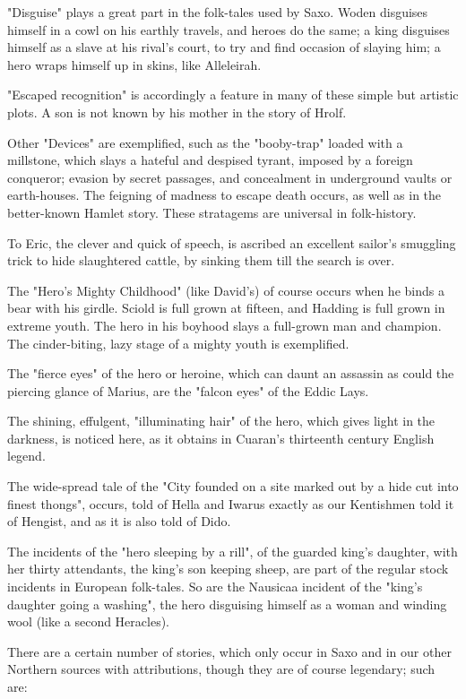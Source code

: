 \documentclass[10pt,a4paper]{report}
\begin{document}
"Disguise" plays a great part in the folk-tales used by Saxo. Woden disguises himself in a cowl on his earthly travels, and heroes do the same; a king disguises himself as a slave at his rival's court, to try and find occasion of slaying him; a hero wraps himself up in skins, like Alleleirah.

"Escaped recognition" is accordingly a feature in many of these simple but artistic plots. A son is not known by his mother in the story of Hrolf.

Other "Devices" are exemplified, such as the "booby-trap" loaded with a millstone, which slays a hateful and despised tyrant, imposed by a foreign conqueror; evasion by secret passages, and concealment in underground vaults or earth-houses. The feigning of madness to escape death occurs, as well as in the better-known Hamlet story. These stratagems are universal in folk-history.

To Eric, the clever and quick of speech, is ascribed an excellent sailor's smuggling trick to hide slaughtered cattle, by sinking them till the search is over.

The "Hero's Mighty Childhood" (like David's) of course occurs when he binds a bear with his girdle. Sciold is full grown at fifteen, and Hadding is full grown in extreme youth. The hero in his boyhood slays a full-grown man and champion. The cinder-biting, lazy stage of a mighty youth is exemplified.

The "fierce eyes" of the hero or heroine, which can daunt an assassin as could the piercing glance of Marius, are the "falcon eyes" of the Eddic Lays.

The shining, effulgent, "illuminating hair" of the hero, which gives light in the darkness, is noticed here, as it obtains in Cuaran's thirteenth century English legend.

The wide-spread tale of the "City founded on a site marked out by a hide cut into finest thongs", occurs, told of Hella and Iwarus exactly as our Kentishmen told it of Hengist, and as it is also told of Dido.

The incidents of the "hero sleeping by a rill", of the guarded king's daughter, with her thirty attendants, the king's son keeping sheep, are part of the regular stock incidents in European folk-tales. So are the Nausicaa incident of the "king's daughter going a washing", the hero disguising himself as a woman and winding wool (like a second Heracles).

There are a certain number of stories, which only occur in Saxo and in our other Northern sources with attributions, though they are of course legendary; such are:
\end{document}
